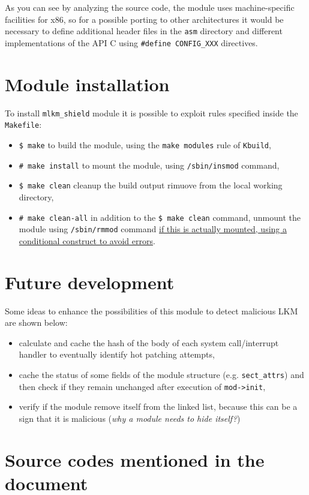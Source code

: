 \documentclass{article}
\newcommand{\terminal}[1]{\colorbox{tn-bg}{\textcolor{tn-fg}{\texttt{#1}}}}
\begin{document}
	As you can see by analyzing the source code, the module uses machine-specific facilities for x86, so for a possible
	porting to other architectures it would be necessary to define additional header files in the \texttt{asm}
	directory and different implementations of the API C using \texttt{\#define CONFIG\_XXX} directives.

	\section{Module installation}
	To install \texttt{mlkm\_shield} module it is possible to exploit rules specified inside the \texttt{Makefile}:
	\begin{itemize}
		\item \terminal{\$ make} to build the module, using the \texttt{make modules} rule of \texttt{Kbuild},
		\item \terminal{\# make install} to mount the module, using \texttt{/sbin/insmod} command,
		\item \terminal{\$ make clean} cleanup the build output rimuove from the local working directory,
		\item \terminal{\# make clean-all} in addition to the \terminal{\$ make clean} command, unmount the module
		using \texttt{/sbin/rmmod} command \ul{if this is actually mounted, using a conditional construct to avoid
		errors}.
	\end{itemize}

	\section{Future development}
	Some ideas to enhance the possibilities of this module to detect malicious LKM are shown below:
	\begin{itemize}
		\item calculate and cache the hash of the body of each system call/interrupt handler to eventually identify hot
		patching attempts,
		\item cache the status of some fields of the module structure (e.g. \texttt{sect\_attrs}) and then check if
		they remain unchanged after execution of \texttt{mod->init},
		\item verify if the module remove itself from the linked list, because this can be a sign that it is
		malicious (\textit{why a module needs to hide itself?})
	\end{itemize}

	\section{Source codes mentioned in the document}
	
\end{document}
